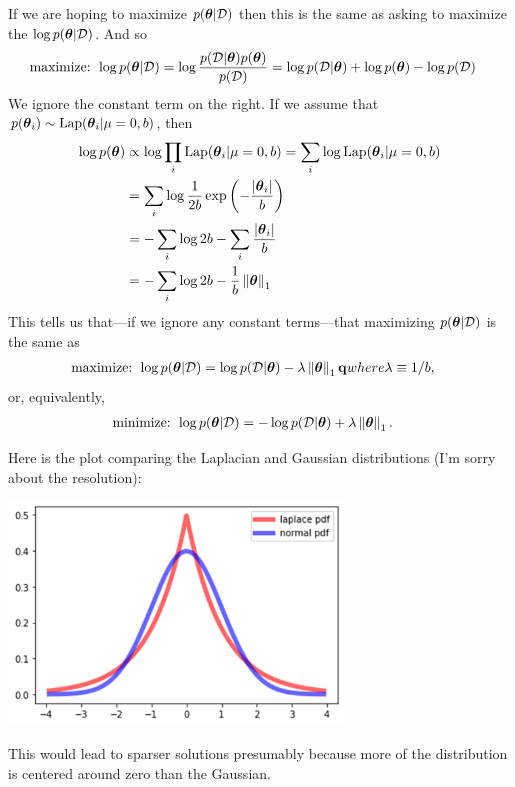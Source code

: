 \documentclass[12pt,letterpaper,fleqn]{hmcpset}
\begin{document}
\begin{solution}
If we are hoping to maximize $p(\hbox{\boldmath$\theta$} | {\cal D})$ then this is the same as asking to maximize the $\log p(\hbox{\boldmath$\theta$} | {\cal D}) $. And so
\begin{align*}
     \text{maximize: }  \log p(\hbox{\boldmath$\theta$} | {\cal D}) &= \log \frac{p({\cal D} | \hbox{\boldmath$\theta$})p(\hbox{\boldmath$\theta$})}{p({\cal D})}= \log p({\cal D} | \hbox{\boldmath$\theta$}) + \log p(\hbox{\boldmath$\theta$}) - \log p({\cal D})
\end{align*}
We ignore the constant term on the right. If we assume that $p(\hbox{\boldmath$\theta$}_i) \sim \mathrm{Lap}(\hbox{\boldmath$\theta$}_i|\mu=0,b)$, then 
\begin{align*}
    \log p(\hbox{\boldmath$\theta$}) &\propto \log \prod_i \mathrm{Lap}(\hbox{\boldmath$\theta$}_i|\mu=0,b)= \sum_i \log \mathrm{Lap}(\hbox{\boldmath$\theta$}_i|\mu=0,b) \\
    &=\sum_i \log\frac{1}{2b}\exp\left(-\frac{|\hbox{\boldmath$\theta$}_i|}{b}\right) \\
    &= - \sum_i\log 2b - \sum_i \frac{\abs{\hbox{\boldmath$\theta$}_i}}{b} \\
    &= - \sum_i\log 2b - \frac{1}{b}\left\lVert\hbox{\boldmath$\theta$}\right\rVert_1
\end{align*}
This tells us that---if we ignore any constant terms---that maximizing $p(\hbox{\boldmath$\theta$}|{\cal D})$ is the same as
\begin{align*}
    \text{maximize: }  \log p(\hbox{\boldmath$\theta$} | {\cal D}) &= \log p({\cal D} | \hbox{\boldmath$\theta$}) - \lambda \left\lVert\hbox{\boldmath$\theta$}\right\rVert_1 {\bf q}{where} \lambda \equiv 1/b,
\end{align*}
or, equivalently,
\begin{align*}
    \text{minimize: }  \log p(\hbox{\boldmath$\theta$} | {\cal D}) &= -\log p({\cal D} | \hbox{\boldmath$\theta$}) + \lambda \left\lVert\hbox{\boldmath$\theta$}\right\rVert_1.
\end{align*}

Here is the plot comparing the Laplacian and Gaussian distributions (I'm sorry about the resolution):
\begin{center}
    \includegraphics[width = 3.5in]{dist.png}
\end{center}
This would lead to sparser solutions presumably because more of the distribution is centered around zero than the Gaussian.
\end{solution}
\end{document}
